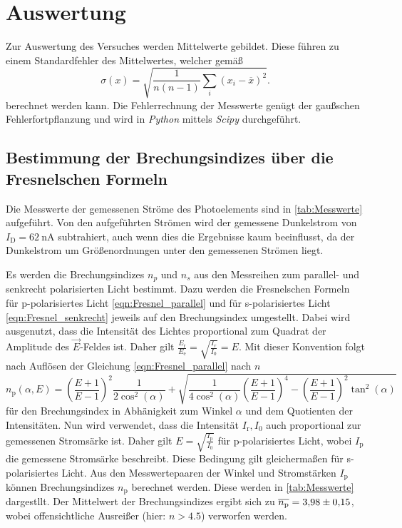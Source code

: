 \section{Auswertung}
\label{sec:Auswertung}
Zur Auswertung des Versuches werden Mittelwerte gebildet. Diese führen zu einem Standardfehler des Mittelwertes, welcher gemäß
\begin{equation*}
  \label{eqn:MW-Fehler}
  \sigma(x) = \sqrt{\frac{1}{n(n-1)} \sum_i (x_i - \overline{x})^2}.
\end{equation*}
berechnet werden kann. Die Fehlerrechnung der Messwerte genügt der gaußschen Fehlerfortpflanzung und wird in \textit{Python} mittels \textit{Scipy} \cite{scipy} durchgeführt.

\subsection{Bestimmung der Brechungsindizes über die Fresnelschen Formeln}
\label{subsec:Index_Fresnel}
Die Messwerte der gemessenen Ströme des Photoelements sind in \autoref{tab:Messwerte} aufgeführt.
Von den aufgeführten Strömen wird der gemessene Dunkelstrom von $I_\text{D} = \qty{62}{\nano\ampere}$ subtrahiert, auch wenn dies die Ergebnisse kaum beeinflusst, da 
der Dunkelstrom um Größenordnungen unter den gemessenen Strömen liegt.

Es werden die Brechungsindizes $n_p$ und $n_s$ aus den Messreihen zum parallel- und senkrecht polarisierten Licht bestimmt.
Dazu werden die Fresnelschen Formeln für p-polarisiertes Licht \eqref{eqn:Fresnel_parallel} und für s-polarisiertes Licht \eqref{eqn:Fresnel_senkrecht} jeweils auf den 
Brechungsindex umgestellt. Dabei wird ausgenutzt, dass die Intensität des Lichtes proportional zum Quadrat der Amplitude des $\vec{E}$-Feldes ist. 
Daher gilt $\frac{E_\text{r}}{E_\text{e}} = \sqrt{\frac{I_r}{I_0}} = E$. Mit dieser Konvention folgt nach Auflösen der Gleichung \eqref{eqn:Fresnel_parallel} nach $n$
\begin{equation}
  \label{eqn:n_p}
  n_\text{p}(\alpha, E) = \left(\frac{E + 1}{E - 1}\right)^2 \frac{1}{2\cos^2(\alpha)} + \sqrt{\frac{1}{4\cos^2(\alpha)}\left(\frac{E + 1}{E - 1}\right)^4 - \left(\frac{E + 1}{E - 1}\right)^2\tan^2(\alpha)}
\end{equation}
für den Brechungsindex in Abhänigkeit zum Winkel $\alpha$ und dem Quotienten der Intensitäten. 
Nun wird verwendet, dass die Intensität $I_\text{r}, I_0$ auch proportional zur gemessenen Stromsärke ist. Daher gilt $E = \sqrt{\frac{I_\text{p}}{I_0}}$ für p-polarisiertes
Licht, wobei $I_\text{p}$ die gemessene Stromsärke beschreibt. Diese Bedingung gilt gleichermaßen für s-polarisiertes Licht.
Aus den Messwertepaaren der Winkel und Stromstärken $I_\text{p}$ können 
Brechungsindizes $n_\text{p}$ berechnet werden. Diese
werden in \autoref{tab:Messwerte} dargestllt. Der Mittelwert der Brechungsindizes ergibt sich zu $\overline{n_\text{p}} = \num{3.98+-0.15}$, wobei offensichtliche Ausreißer
(hier: $n > \num{4.5}$) verworfen werden.

